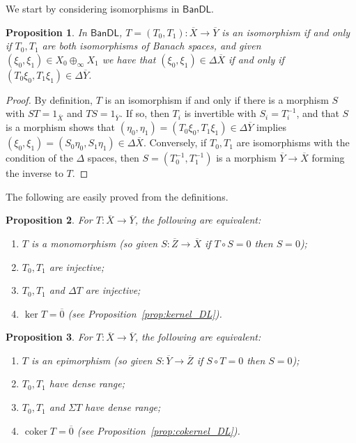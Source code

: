 \documentclass[a4paper,11pt]{article}
\theoremstyle{plain}
\newtheorem{proposition}{Proposition}[section]
\theoremstyle{remark}
\newcommand{\msf}[1]{\mathsf{#1}}
\newcommand{\coker}{\operatorname{coker}}
\begin{document}
We start by considering isomorphisms in $\msf{BanDL}$.

\begin{proposition}\label{prop:isomorphism_DL}
In $\msf{BanDL}$, $T=(T_0,T_1) \colon \overline X \to \overline Y$ is an isomorphism if and only if $T_0,T_1$ are both isomorphisms of Banach spaces, and given $(\xi_0,\xi_1) \in X_0\oplus_\infty X_1$ we have that $(\xi_0,\xi_1) \in \Delta\overline X$ if and only if $(T_0\xi_0, T_1\xi_1) \in \Delta\overline Y$.
\end{proposition}
\begin{proof}
By definition, $T$ is an isomorphism if and only if there is a morphism $S$ with $ST = 1_{\overline X}$ and $TS = 1_{\overline Y}$.  If so, then $T_i$ is invertible with $S_i = T_i^{-1}$, and that $S$ is a morphism shows that $(\eta_0, \eta_1) = (T_0\xi_0, T_1\xi_1) \in \Delta\overline Y$ implies $(\xi_0,\xi_1) = (S_0\eta_0, S_1\eta_1)\in\Delta\overline X$.  Conversely, if $T_0,T_1$ are isomorphisms with the condition of the $\Delta$ spaces, then $S = (T_0^{-1}, T_1^{-1})$ is a morphism $\overline Y\to\overline X$ forming the inverse to $T$.
\end{proof}

The following are easily proved from the definitions.

\begin{proposition}\label{prop:monomorphism_DL}
For $T\colon\overline X\to\overline Y$, the following are equivalent:
\begin{enumerate}
  \item $T$ is a monomorphism (so given $S\colon\overline Z\to\overline X$ if $T\circ S = 0$ then $S=0$);
  \item $T_0, T_1$ are injective;
  \item $T_0, T_1$ and $\Delta T$ are injective;
  \item $\ker T = \overline{0}$ (see Proposition~\ref{prop:kernel_DL}).
\end{enumerate}
\end{proposition}

\begin{proposition}\label{prop:epimorphism_DL}
For $T\colon\overline X\to\overline Y$, the following are equivalent:
\begin{enumerate}
  \item $T$ is an epimorphism (so given $S\colon\overline Y\to\overline Z$ if $S\circ T = 0$ then $S=0$);
  \item $T_0, T_1$ have dense range;
  \item $T_0, T_1$ and $\Sigma T$ have dense range;
  \item $\coker T = \overline{0}$ (see Proposition~\ref{prop:cokernel_DL}).
\end{enumerate}
\end{proposition}
\end{document}
